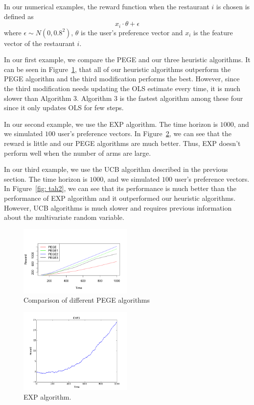 \documentclass{article}
\theoremstyle{plain}
\theoremstyle{definition}
\begin{document}
In our numerical examples, the reward function when the restaurant
$i$ is chosen is defined as 
\[
x_{i}\cdot\theta+\epsilon
\]
where $\epsilon\sim N\left(0,0.8^{2}\right)$, $\theta$ is the user's
preference vector and $x_{i}$ is the feature vector of the restaurant
$i$.

In our first example, we compare the PEGE and our three heuristic algorithms. It can be seen in Figure~\ref{fig: tah0}, that all of our heuristic algorithms outperform the PEGE algorithm and the third modification performs the best. However, since the third modification needs updating the OLS estimate every time, it is much slower than Algorithm 3. Algorithm 3 is the fastest algorithm among these four since it only updates OLS for few steps.


In our second example, we use the EXP algorithm.
The time horizon is $1000$, and we simulated $100$ user's preference
vectors. In Figure~\ref{fig: tahi}, we can see that the reward is little and our PEGE algorithms are much better. Thus, EXP doesn't perform well when the number of arms are large.

In our third example, we use the UCB algorithm described in the previous
section. The time horizon is $1000$, and we simulated $100$ user's
preference vectors.  In Figure~\ref{fig: tah2}, we can see that its performance is much better than the performance of EXP algorithm and it outperformed our heuristic algorithms. However, UCB algorithms is much slower and requires previous information about the multivariate random variable.

\begin{figure}[htb]
{
\centering
\includegraphics[width=0.50\textwidth,]{algo_compare}
\caption{Comparison of different PEGE algorithms \label{fig: tah0}}
}
\end{figure}




\begin{figure}[htb]
{
\centering
\includegraphics[width=0.50\textwidth]{plot11}
\caption{EXP algorithm. \label{fig: tahi}}
}
\end{figure}
\end{document}
